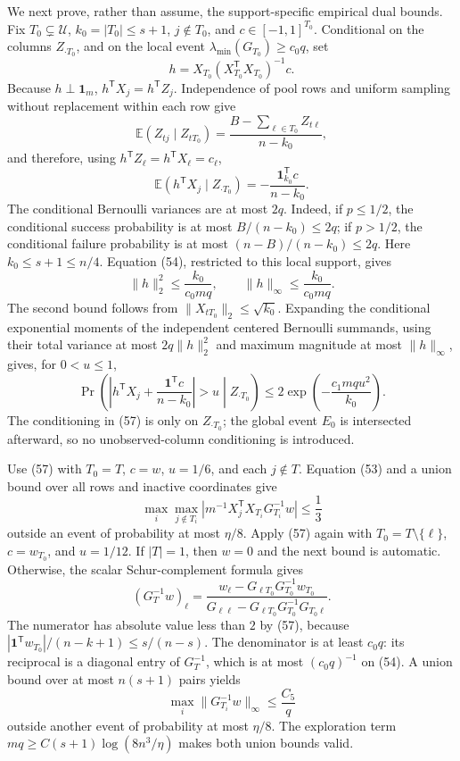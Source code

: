 We next prove, rather than assume, the support-specific empirical dual bounds.  Fix \(T_0\subsetneq\mathcal U\), \(k_0=|T_0|\le s+1\), \(j\notin T_0\), and \(c\in[-1,1]^{T_0}\).  Conditional on the columns \(Z_{\cdot T_0}\), and on the local event \(\lambda_{\min}(G_{T_0})\ge c_0q\), set
\[
 h=X_{T_0}(X_{T_0}^{\mathsf T}X_{T_0})^{-1}c.
\]
Because \(h\perp\mathbf1_m\), \(h^{\mathsf T}X_j=h^{\mathsf T}Z_j\).  Independence of pool rows and uniform sampling without replacement within each row give
\[
 \mathbb E(Z_{tj}\mid Z_{tT_0})
 =\frac{B-\sum_{\ell\in T_0}Z_{t\ell}}{n-k_0},
\]
and therefore, using \(h^{\mathsf T}Z_\ell=h^{\mathsf T}X_\ell=c_\ell\),
\[
 \mathbb E(h^{\mathsf T}X_j\mid Z_{\cdot T_0})
 =-\frac{\mathbf1_{k_0}^{\mathsf T}c}{n-k_0}.
 \tag{55}
\]
The conditional Bernoulli variances are at most \(2q\).  Indeed, if \(p\le1/2\), the conditional success probability is at most \(B/(n-k_0)\le2q\); if \(p>1/2\), the conditional failure probability is at most \((n-B)/(n-k_0)\le2q\).  Here \(k_0\le s+1\le n/4\).  Equation (54), restricted to this local support, gives
\[
 \lVert h\rVert_2^2\le\frac{k_0}{c_0mq},
 \qquad
 \lVert h\rVert_\infty\le\frac{k_0}{c_0mq}.
 \tag{56}
\]
The second bound follows from \(\lVert X_{tT_0}\rVert_2\le\sqrt{k_0}\).  Expanding the conditional exponential moments of the independent centered Bernoulli summands, using their total variance at most \(2q\lVert h\rVert_2^2\) and maximum magnitude at most \(\lVert h\rVert_\infty\), gives, for \(0<u\le1\),
\[
 \Pr\!\left(
  \left|h^{\mathsf T}X_j+\frac{\mathbf1^{\mathsf T}c}{n-k_0}\right|>u
  \middle|Z_{\cdot T_0}\right)
 \le2\exp\!\left(-\frac{c_1mqu^2}{k_0}\right).
 \tag{57}
\]
The conditioning in (57) is only on \(Z_{\cdot T_0}\); the global event \(E_0\) is intersected afterward, so no unobserved-column conditioning is introduced.

Use (57) with \(T_0=T\), \(c=w\), \(u=1/6\), and each \(j\notin T\).  Equation (53) and a union bound over all rows and inactive coordinates give
\[
 \max_i\max_{j\notin T_i}
 \left|m^{-1}X_j^{\mathsf T}X_{T_i}G_{T_i}^{-1}w\right|
 \le\frac13
 \tag{58}
\]
outside an event of probability at most \(\eta/8\).  Apply (57) again with \(T_0=T\setminus\{\ell\}\), \(c=w_{T_0}\), and \(u=1/12\).  If \(|T|=1\), then \(w=0\) and the next bound is automatic.  Otherwise, the scalar Schur-complement formula gives
\[
 (G_T^{-1}w)_\ell
 =\frac{w_\ell-G_{\ell T_0}G_{T_0}^{-1}w_{T_0}}
 {G_{\ell\ell}-G_{\ell T_0}G_{T_0}^{-1}G_{T_0\ell}}.
\]
The numerator has absolute value less than \(2\) by (57), because
\(|\mathbf1^{\mathsf T}w_{T_0}|/(n-k+1)\le s/(n-s)\).  The denominator is at least \(c_0q\): its reciprocal is a diagonal entry of \(G_T^{-1}\), which is at most \((c_0q)^{-1}\) on (54).  A union bound over at most \(n(s+1)\) pairs yields
\[
 \max_i\lVert G_{T_i}^{-1}w\rVert_\infty\le\frac{C_5}{q}
 \tag{59}
\]
outside another event of probability at most \(\eta/8\).  The exploration term \(mq\ge C(s+1)\log(8n^3/\eta)\) makes both union bounds valid.

